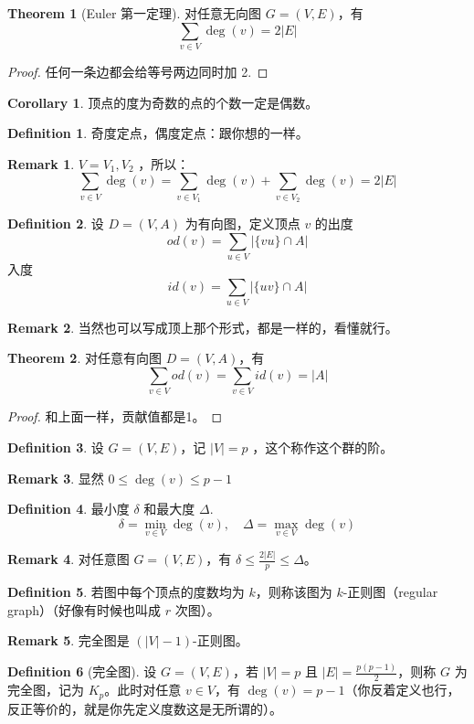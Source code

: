 \documentclass[oneside]{book}
\theoremstyle{definition}
\newtheorem{definition}{Definition}[section]
\newtheorem{theorem}{Theorem}[section]
\newtheorem{corollary}{Corollary}[section]
\newtheorem{remark}{Remark}[section]
\begin{document}
\begin{theorem}[Euler 第一定理]
	对任意无向图 \( G=(V,E) \)，有
	\[
	\sum_{v\in V} \deg(v) = 2|E|
	\]
\end{theorem}
\begin{proof}
	任何一条边都会给等号两边同时加 2.
\end{proof}
\begin{corollary}
	顶点的度为奇数的点的个数一定是偶数。
\end{corollary}
\begin{definition}
	奇度定点，偶度定点：跟你想的一样。
	\end{definition}
	\begin{remark}
		\(V={V_1,V_2}\) ，所以：
		\[
		\sum_{v\in V} \deg(v) =\sum_{v\in V_1} \deg(v) +\sum_{v\in V_2} \deg(v) =2|E|
		\]
	\end{remark}


\begin{definition}
	设 \( D=(V,A) \) 为有向图，定义顶点 \( v \) 的出度 \[ od(v) = \sum_{u\in V} \left| \{vu\} \cap A \right| \]入度 \[ id(v) = \sum_{u\in V} \left| \{uv\} \cap A \right| \]
\end{definition}
\begin{remark}
	当然也可以写成顶上那个形式，都是一样的，看懂就行。
\end{remark}
\begin{theorem}
	对任意有向图 \( D=(V,A) \)，有
	\[
	\sum_{v\in V} od(v) = \sum_{v\in V} id(v) = |A|
	\]
\end{theorem}
\begin{proof}
	和上面一样，贡献值都是1。
\end{proof}
\begin{definition}
	设 \( G=(V,E) \)，记 \( |V|=p \) ，这个称作这个群的阶。
\end{definition}
\begin{remark}
	显然 \( 0 \leq \deg(v) \leq p-1 \)
\end{remark}
\begin{definition}
	最小度 \(\delta\) 和最大度 \(\Delta\).
	\[
	\delta = \min_{v \in V} \deg(v),\quad \Delta = \max_{v \in V} \deg(v)
	\]
\end{definition}

\begin{remark}
	对任意图 \( G=(V,E) \)，有 \( \delta \leq \frac{2|E|}{p} \leq \Delta \)。
\end{remark}
\begin{definition}
	若图中每个顶点的度数均为 \( k \)，则称该图为 \( k \)-正则图（regular graph）（好像有时候也叫成 \(r\) 次图）。
\end{definition}
\begin{remark}
	完全图是 \( (|V|-1) \)-正则图。
\end{remark}
\begin{definition}[完全图]
	设 \( G=(V,E) \)，若 \( |V|=p \) 且 \( |E|=\frac{p(p-1)}{2} \)，则称 \( G \) 为完全图，记为 \( K_p \)。此时对任意 \( v \in V \)，有 \( \deg(v)=p-1 \)（你反着定义也行，反正等价的，就是你先定义度数这是无所谓的）。
\end{definition}
\end{document}
